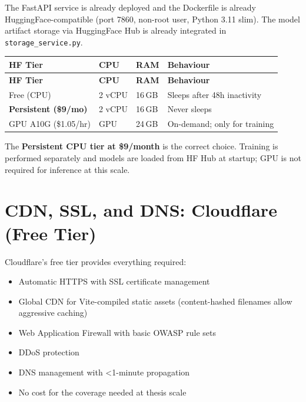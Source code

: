 \documentclass[12pt,a4paper]{report}
\begin{document}
The FastAPI service is already deployed and the Dockerfile is already
HuggingFace-compatible (port 7860, non-root user, Python 3.11 slim).
The model artifact storage via HuggingFace Hub is already integrated in
\texttt{storage\_service.py}.

\begin{longtable}{L{3cm} L{2.5cm} L{2.5cm} L{4cm}}
    \toprule
    \textbf{HF Tier} & \textbf{CPU} & \textbf{RAM} & \textbf{Behaviour} \\
    \midrule
    \endfirsthead
    \toprule
    \textbf{HF Tier} & \textbf{CPU} & \textbf{RAM} & \textbf{Behaviour} \\
    \midrule
    \endhead
    \bottomrule
    \endlastfoot

    Free (CPU) & 2 vCPU & 16\,GB & Sleeps after 48h inactivity \\[4pt]
    \textbf{Persistent (\$9/mo)} & 2 vCPU & 16\,GB & Never sleeps \\[4pt]
    GPU A10G (\$1.05/hr) & GPU & 24\,GB & On-demand; only for training \\

\end{longtable}

The \textbf{Persistent CPU tier at \$9/month} is the correct choice.
Training is performed separately and models are loaded from HF Hub
at startup; GPU is not required for inference at this scale.

\section{CDN, SSL, and DNS: Cloudflare (Free Tier)}

Cloudflare's free tier provides everything required:

\begin{itemize}[leftmargin=1.5em]
    \item Automatic HTTPS with SSL certificate management
    \item Global CDN for Vite-compiled static assets
          (content-hashed filenames allow aggressive caching)
    \item Web Application Firewall with basic OWASP rule sets
    \item DDoS protection
    \item DNS management with \textless 1-minute propagation
    \item No cost for the coverage needed at thesis scale
\end{itemize}
\end{document}
